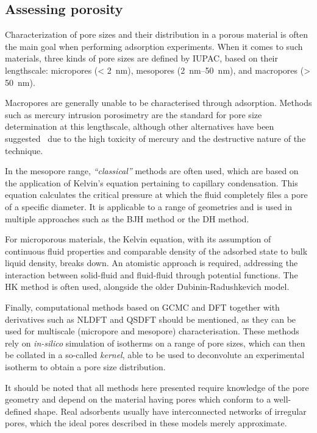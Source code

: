 
\subsection{Assessing porosity}

Characterization of pore sizes and their distribution in a porous material
is often the main goal when performing adsorption experiments.
When it comes to such materials, three kinds of pore sizes are
defined by IUPAC, based on their lengthscale: micropores (\SI{< 2}{\nano\metre}),
mesopores (\SIrange{2}{50}{\nano\metre}), and macropores (\SI{> 50}{\nano\metre}).

Macropores are generally unable to be characterised through adsorption.
Methods such as mercury intrusion porosimetry are the standard for pore
size determination at this lengthscale, although other alternatives have
been suggested~\cite{rouquerolCharacterizationMacroporousSolids2012} due
to the high toxicity of mercury and the destructive nature of the technique.

In the mesopore range, \textit{``classical''} methods are often
used, which are based on the application of Kelvin's equation
pertaining to capillary condensation. This equation calculates the
critical pressure at which the fluid completely files a pore of a
specific diameter. It is applicable to a range of geometries and
is used in multiple approaches such as the \gls{BJH} method 
or the \gls{DH} method.

For microporous materials, the Kelvin equation, with its assumption
of continuous fluid properties and comparable density of the adsorbed
state to bulk liquid density, breaks down. An atomistic approach
is required, addressing the interaction between solid-fluid
and fluid-fluid through potential functions. The \gls{HK} method 
is often used, alongside the older Dubinin-Radushkevich
model.

Finally, computational methods based on \gls{GCMC} and \gls{DFT} 
together with derivatives such as \gls{NLDFT} and \gls{QSDFT} 
should be mentioned, as they can be used for multiscale
(micropore and mesopore) characterisation. These methods rely on
\textit{in-silico} simulation of isotherms on a range of pore sizes,
which can then be collated in a so-called \textit{kernel}, able to
be used to deconvolute an experimental isotherm to obtain a
pore size distribution.

It should be noted that all methods here presented require knowledge of
the pore geometry and depend on the material having pores which
conform to a well-defined shape. Real adsorbents usually have
interconnected networks of irregular pores, which the ideal pores
described in these models merely approximate.

